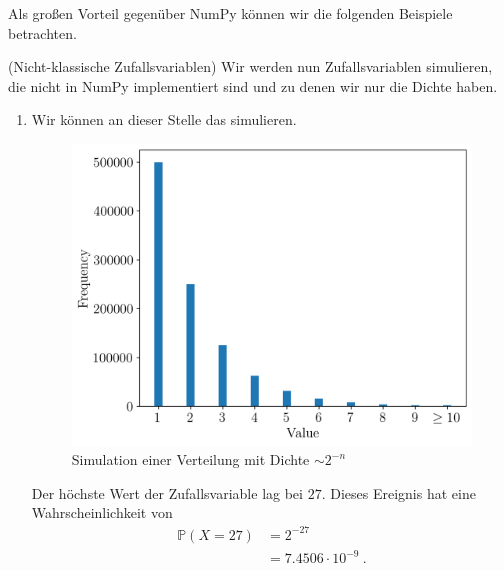 \newpage

Als großen Vorteil gegenüber NumPy können wir die folgenden Beispiele betrachten.

\begin{Beispiel}{(Nicht-klassische Zufallsvariablen)}
Wir werden nun Zufallsvariablen simulieren, die nicht in NumPy implementiert sind und zu denen wir nur die Dichte haben.
\begin{enumerate}[label=(\roman*)]
\item Wir können an dieser Stelle das \hyperlink{Bsp:Münze}{} simulieren.
\begin{figure}[H]
\centering
\includegraphics[width=0.5\linewidth]{./Section/Simulation/Sim Dis.png}
\caption{Simulation einer Verteilung mit Dichte $\sim 2^{- n}$}
\end{figure}
Der höchste Wert der Zufallsvariable lag bei $27$. Dieses Ereignis hat eine Wahrscheinlichkeit von
\begin{align*}
\mathbb{P}(X = 27) &= 2^{-27}\\
&= 7.4506 \cdot 10^{-9}~.
\end{align*}


\end{enumerate}
\end{Beispiel}

